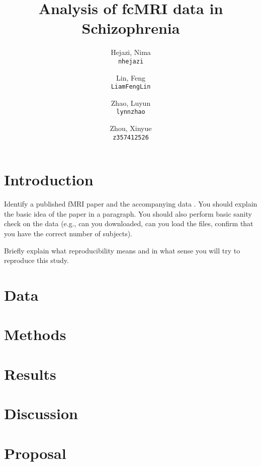 \documentclass[11pt]{article}
\title{Analysis of fcMRI data in Schizophrenia}
\author{
  Hejazi, Nima\\
  \texttt{nhejazi}
  \and
  Lin, Feng\\
  \texttt{LiamFengLin}
  \and
 Zhao, Luyun\\
  \texttt{lynnzhao}
  \and
  Zhou, Xinyue\\
  \texttt{z357412526}
}
\begin{document}
\maketitle


\section{Introduction}

Identify a published fMRI paper and the accompanying data
\cite{lindquist2008statistical}.  You should explain the basic idea of the
paper in a paragraph.  You should also perform basic sanity check on the data
(e.g., can you downloaded, can you load the files, confirm that you have the
correct number of subjects).

Briefly explain what reproducibility means and in what sense you will
try to reproduce this study.

\section{Data}

\section{Methods}
\section{Results}
\section{Discussion}

\section{Proposal}
\end{document}
